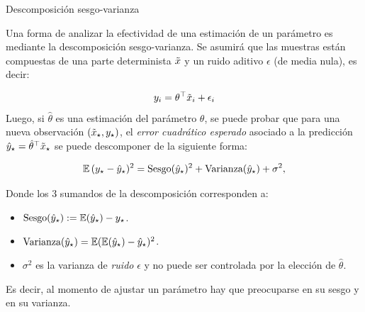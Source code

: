 \documentclass[9pt]{beamer}
\begin{document}
\begin{frame}{Descomposición sesgo-varianza}

Una forma de analizar la efectividad de una estimación de un parámetro es mediante la descomposición sesgo-varianza. Se asumirá que las muestras están compuestas de una parte determinista $\tilde{x}$ y un ruido aditivo $\epsilon$ (de media nula), es decir:

\begin{equation*}
	y_i = \theta^\top\tilde{x}_i + \epsilon_i
 \end{equation*}\pause
Luego, si $\hat\theta$ es una estimación del parámetro $\theta$, se puede probar que para una nueva observación $(\tilde{x}_\star,y_\star)$, el \emph{error cuadrático esperado} asociado a la predicción $\hat y_\star = \hat\theta^\top \tilde{x}_\star$ se puede descomponer de la siguiente forma:
 
\begin{equation*}
 	\operatorname{\mathbb{E}}{(y_\star - \hat y_\star)^2} = \text{Sesgo}(\hat y_\star)^2 + \text{Varianza}(\hat y_\star) + \sigma^2,\label{eq:expected_sq_loss}
 \end{equation*}

Donde los 3 sumandos de la descomposición corresponden a:\pause
 \begin{itemize}
 	\item $\text{Sesgo}(\hat y_\star) := \operatorname{\mathbb{E}}(\hat y_\star) - y_\star$.\pause
 	\item $\text{Varianza}(\hat y_\star) = \operatorname{\mathbb{E}}(\operatorname{\mathbb{E}}(\hat y_\star)- \hat y_\star)^2$.\pause
 	\item $\sigma^2$ es la varianza de \emph{ruido} $\epsilon$ y no puede ser controlada por la elección de $\hat\theta$.\pause
 \end{itemize}
 
 Es decir, al momento de ajustar un parámetro hay que preocuparse en su sesgo y en su varianza.

\end{frame}
\end{document}
